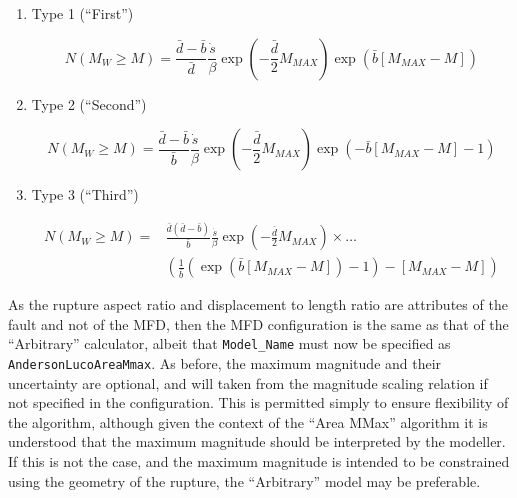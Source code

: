 \begin{enumerate}

\item Type 1 (``First'')

\begin{equation}
N \left( {M_W \geq M} \right) = \frac{\bar{d} - \bar{b}}{\bar{d}} \frac{\dot{s}}{\beta} \exp \left( {-\frac{\bar{d}}{2} M_{MAX}} \right) \exp \left( {\bar{b} \left[ {M_{MAX} - M} \right]} \right)
\end{equation}


\item Type 2 (``Second'')

\begin{equation}
N \left( {M_W \geq M} \right) = \frac{\bar{d} - \bar{b}}{\bar{b}}  \frac{\dot{s}}{\beta} \exp \left( {-\frac{\bar{d}}{2} M_{MAX}} \right)  \exp \left( {-\bar{b} \left[ {M_{MAX} - M} \right] - 1} \right)
\end{equation}

\item Type 3 (``Third'')

\begin{equation}
\begin{split}
N \left( {M_W \geq M} \right) = & \frac{\bar{d} \left( {\bar{d} - \bar{b}} \right)}{\bar{b}} \frac{\dot{s}}{\beta} \exp \left( {-\frac{\bar{d}}{2} M_{MAX}} \right) \times \ldots \\ 
& \left( {\frac{1}{\bar{b}} \left( {\exp \left( {\bar{b} \left[ {M_{MAX} - M} \right]} \right) - 1} \right) - \left[ {M_{MAX} - M} \right]} \right)
\end{split}
\end{equation}

\end{enumerate}

As the rupture aspect ratio and displacement to length ratio are attributes of the fault and not of the MFD, then the MFD configuration is the same as that of the \cite{AndersonLuco1983} ``Arbitrary'' calculator, albeit that \verb=Model_Name= must now be specified as \verb=AndersonLucoAreaMmax=. As before, the maximum magnitude and their uncertainty are optional, and will taken from the magnitude scaling relation if not specified in the configuration. This is permitted simply to ensure flexibility of the algorithm, although given the context of the ``Area MMax'' algorithm it is understood that the maximum magnitude should be interpreted by the modeller. If this is not the case, and the maximum magnitude is intended to be constrained using the geometry of the rupture, the ``Arbitrary'' model may be preferable.

